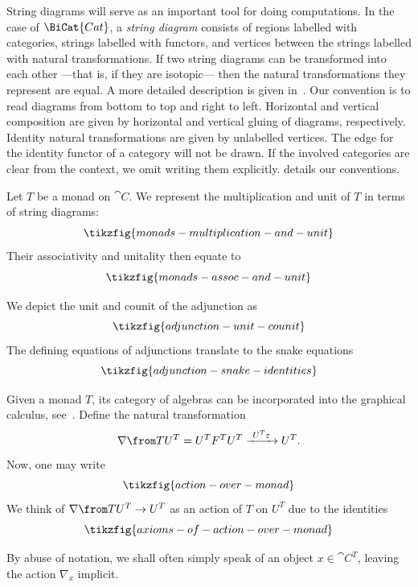 String diagrams will serve as an important tool for doing computations.
In the case of \(\BiCat{Cat}\),
a \emph{string diagram} consists of
regions labelled with categories,
strings labelled with functors,
and vertices between the strings labelled with natural transformations.
If two string diagrams can be transformed into each other%
—that is, if they are isotopic—%
then the natural transformations they represent are equal.
A more detailed description is given in~\cite{joyal91,Selinger2011}.
Our convention is to read diagrams from bottom to top and right to left.
Horizontal and vertical composition are given by horizontal and vertical gluing of diagrams, respectively.
Identity natural transformations are given by unlabelled vertices.
The edge for the identity functor of a category will not be drawn.
If the involved categories are clear from the context, we omit writing them explicitly.
 details our conventions.
\begin{figure}[htbp]
  \centering
  \vspace{-0.2cm}%
\end{figure}

\begin{example}\label{ex:graphical-monads}
  Let \(T\) be a monad on \(\cat{C}\).
  We represent the multiplication and unit of \(T\) in terms of string diagrams:
  \[
    \tikzfig{monads-multiplication-and-unit}
  \]
  Their associativity and unitality then equate to
  \[
    \tikzfig{monads-assoc-and-unit}
  \]

  We depict the unit and counit of the \EilenbergMoore{} adjunction as
  \[
    \tikzfig{adjunction-unit-counit}
  \]
  The defining equations of adjunctions translate to the snake equations
  \[
    \tikzfig{adjunction-snake-identities}
  \]
\end{example}

\begin{remark}\label{rmk:diagrammatic-algebras}
  Given a monad \(T\), its category of algebras can be incorporated into the graphical calculus, see~\cite{Willerton2008}.
  Define the natural transformation
  \begin{equation}\label{eq:action-as-nat-trafo}
    \nabla \from T U^T = U^T F^T U^T \xrightarrow{\ U^T\varepsilon\ } U^T.
  \end{equation}
  Now, one may write
  \[
    \tikzfig{action-over-monad}
  \]
  We think of \(\nabla \from T U^T \to U^T\) as
  an action of \(T\) on \(U^T\) due to the identities
  \[
    \tikzfig{axioms-of-action-over-monad}
  \]

  By abuse of notation, we shall often simply speak of an object \(x \in \cat{C}^T\),
  leaving the action \(\nabla_x\) implicit.
\end{remark}


